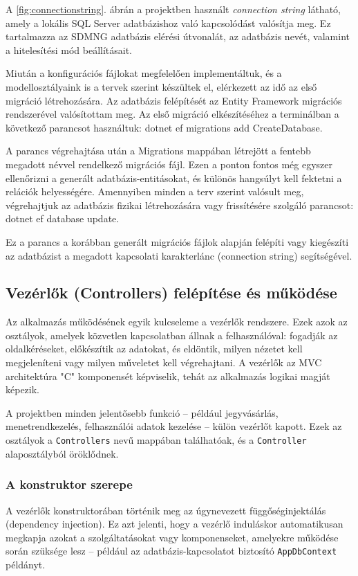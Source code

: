 A \ref{fig:connectionstring}. ábrán a projektben használt \textit{connection string} látható, amely a lokális SQL Server adatbázishoz való kapcsolódást valósítja meg. Ez tartalmazza az SDMNG adatbázis elérési útvonalát, az adatbázis nevét, valamint a hitelesítési mód beállításait.
\vspace{\baselineskip}

Miután a konfigurációs fájlokat megfelelően implementáltuk, és a modellosztályaink is a tervek szerint készültek el, elérkezett az idő az első migráció létrehozására. Az adatbázis felépítését az Entity Framework migrációs rendszerével valósítottam meg. Az első migráció elkészítéséhez a terminálban a következő parancsot használtuk: dotnet ef migrations add CreateDatabase.

A parancs végrehajtása után a Migrations mappában létrejött a fentebb megadott névvel rendelkező migrációs fájl. Ezen a ponton fontos még egyszer ellenőrizni a generált adatbázis-entitásokat, és különös hangsúlyt kell fektetni a relációk helyességére. Amennyiben minden a terv szerint valósult meg, végrehajtjuk az adatbázis fizikai létrehozására vagy frissítésére szolgáló parancsot: dotnet ef database update.

Ez a parancs a korábban generált migrációs fájlok alapján felépíti vagy kiegészíti az adatbázist a megadott kapcsolati karakterlánc (connection string) segítségével.

\subsection{Vezérlők (Controllers) felépítése és működése}
Az alkalmazás működésének egyik kulcseleme a vezérlők rendszere. Ezek azok az osztályok, amelyek közvetlen kapcsolatban állnak a felhasználóval: fogadják az oldalkéréseket, előkészítik az adatokat, és eldöntik, milyen nézetet kell megjeleníteni vagy milyen műveletet kell végrehajtani. A vezérlők az MVC architektúra "C" komponensét képviselik, tehát az alkalmazás logikai magját képezik.

A projektben minden jelentősebb funkció – például jegyvásárlás, menetrendkezelés, felhasználói adatok kezelése – külön vezérlőt kapott. Ezek az osztályok a \texttt{Controllers} nevű mappában találhatóak, és  a \texttt{Controller} alaposztályból öröklődnek.

\subsubsection{A konstruktor szerepe}
A vezérlők konstruktorában történik meg az úgynevezett függőséginjektálás (dependency injection). Ez azt jelenti, hogy a vezérlő induláskor automatikusan megkapja azokat a szolgáltatásokat vagy komponenseket, amelyekre működése során szüksége lesz – például az adatbázis-kapcsolatot biztosító \texttt{AppDbContext} példányt.

